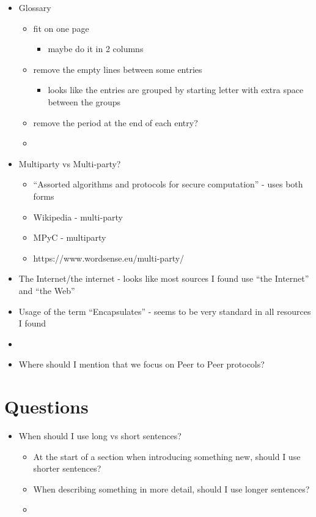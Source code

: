 \begin{itemize}
\tightlist
\item
  Glossary

  \begin{itemize}
  \tightlist
  \item
    fit on one page

    \begin{itemize}
    \tightlist
    \item
      maybe do it in 2 columns
    \end{itemize}
  \item
    remove the empty lines between some entries

    \begin{itemize}
    \tightlist
    \item
      looks like the entries are grouped by starting letter with extra
      space between the groups
    \end{itemize}
  \item
    remove the period at the end of each entry?
  \item
  \end{itemize}
\item
  Multiparty vs Multi-party?

  \begin{itemize}
  \tightlist
  \item
    ``Assorted algorithms and protocols for secure computation'' - uses
    both forms
  \item
    Wikipedia - multi-party
  \item
    MPyC - multiparty
  \item
    https://www.wordsense.eu/multi-party/
  \end{itemize}
\item
  The Internet/the internet - looks like most sources I found use ``the
  Internet'' and ``the Web''
\item
  Usage of the term ``Encapsulates'' - seems to be very standard in all
  resources I found
\item
\item
  Where should I mention that we focus on Peer to Peer protocols?
\end{itemize}

\hypertarget{questions}{%
\chapter{Questions}\label{questions}}

\begin{itemize}
\tightlist
\item
  When should I use long vs short sentences?

  \begin{itemize}
  \tightlist
  \item
    At the start of a section when introducing something new, should I
    use shorter sentences?
  \item
    When describing something in more detail, should I use longer
    sentences?
  \item
  \end{itemize}
\end{itemize}

